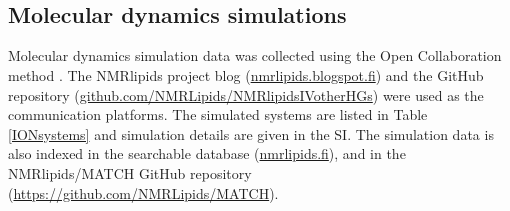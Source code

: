 \documentclass[aps,prl,superscriptaddress,twocolumn]{revtex4}
\begin{document}
 \\
 \\


\subsection{Molecular dynamics simulations}
Molecular dynamics simulation data was collected using
the Open Collaboration method \cite{botan15}.
The NMRlipids project blog (\url{nmrlipids.blogspot.fi}) and
the GitHub repository (\url{github.com/NMRLipids/NMRlipidsIVotherHGs})
were used as the communication platforms.
The simulated systems are listed in Table \ref{IONsystems} and
simulation details are given in the SI.
The simulation data is also indexed in the
searchable database (\url{nmrlipids.fi}),
and in the NMRlipids/MATCH GitHub repository (\url{https://github.com/NMRLipids/MATCH}).  
\end{document}
